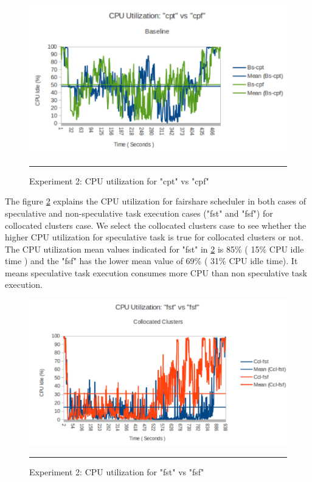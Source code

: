 \begin{figure}[htbp]
  \centering
    \includegraphics[width=\textwidth,height=\textheight,keepaspectratio]{./Figures/exp2_cpu_cpt_vs_cpf.pdf}
    \rule{35em}{0.5pt}
  \caption{Experiment 2: CPU‌ utilization for "cpt" vs "cpf"}
  \label{fig:exp2_cpu_cpt_vs_cpf}
\end{figure} 


    
The figure \ref{fig:exp2_cpu_fst_vs_fsf} explains the CPU utilization for fairshare scheduler in both cases of speculative and non-speculative task execution cases ("fst" and "fsf") for collocated clusters case. We select the collocated clusters case to see whether the higher CPU utilization for speculative task is true for collocated clusters or not. The CPU utilization mean values indicated for "fst" in \ref{fig:exp2_cpu_fst_vs_fsf} is 85\% ( 15\% CPU idle time ) and the "fsf" has the lower mean value of 69\% ( 31\% CPU idle time). It means speculative task execution consumes more CPU than non speculative task execution.



\begin{figure}[htbp]
  \centering
    \includegraphics[width=\textwidth,height=\textheight,keepaspectratio]{./Figures/exp2_cpu_fst_vs_fsf.pdf}
    \rule{35em}{0.5pt}
  \caption{Experiment 2: CPU‌ utilization for "fst" vs "fsf"}
  \label{fig:exp2_cpu_fst_vs_fsf}
\end{figure}






